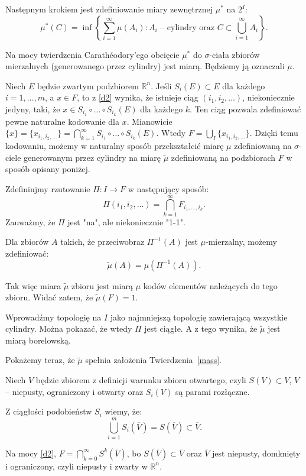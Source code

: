 \documentclass{mini}
\begin{document}
\begin{dow}
Następnym krokiem jest zdefiniowanie miary zewnętrznej $\mu^*$ na $2^I$: 
$$
\mu^*(C)=\inf \left\lbrace \sum_{i=1}^{\infty} \mu(A_i): A_i\textrm{ -- cylindry oraz } C \subset \bigcup_{i=1}^{\infty} A_i \right\rbrace.
$$

Na mocy twierdzenia Carath\'eodory'ego obcięcie $\mu^*$ do $\sigma$-ciała zbiorów mierzalnych (generowanego przez cylindry) jest miarą. Będziemy ją oznaczali $\mu$. 
 

Niech $E$ będzie zwartym podzbiorem $\mathbb{R}^n$. Jeśli $S_i(E)\subset E$ dla każdego $i=1,\ldots,m$, a $x \in F$, to z \eqref{d2} wynika, że istnieje ciąg $(i_1,i_2,\ldots)$, niekoniecznie jedyny, taki, że $x \in S_{i_1}\circ\ldots\circ S_{i_k} (E)$ dla każdego $k$. Ten ciąg pozwala zdefiniować pewne naturalne kodowanie dla $x$. Mianowicie $\lbrace x\rbrace=\lbrace x_{i_1,i_2, \ldots}\rbrace=\bigcap^{\infty}_{k=1} S_{i_1}\circ\ldots\circ S_{i_k} (E)$. Wtedy $F=\bigcup_I \lbrace x_{i_1,i_2, \ldots} \rbrace$. Dzięki temu kodowaniu, możemy w naturalny sposób przekształcić miarę $\mu$ zdefiniowaną na $\sigma$-ciele generowanym przez cylindry na miarę $ \tilde{\mu} $ zdefiniowaną na podzbiorach $F$ w sposób opisany poniżej.

Zdefiniujmy rzutowanie $\Pi: I \longrightarrow F$ w następujący sposób:
$$
\Pi(i_1,i_2,\ldots)=\bigcap^{\infty}_{k=1} F_{i_1, \ldots, i_k}.
$$
Zauważmy, że $\Pi$ jest "na", ale niekoniecznie "1-1". 

Dla zbiorów $A$ takich, że przeciwobraz $\Pi^{-1}(A)$ jest $\mu$-mierzalny, możemy zdefiniować:
$$
\tilde{\mu}(A) = \mu (\Pi^{-1}(A)). 
$$

Tak więc miara $\tilde{\mu}$ zbioru jest miarą $\mu$ kodów elementów należących do tego zbioru.
Widać zatem, że $\tilde{\mu}(F)=1$.

Wprowadźmy topologię na $I$ jako najmniejszą topologię zawierającą wszystkie cylindry. Można pokazać, że wtedy $\Pi$ jest ciągłe. A z tego wynika, że $\tilde{\mu}$ jest miarą borelowską.

Pokażemy teraz, że $\tilde{\mu}$ spełnia założenia Twierdzenia~\ref{mass}.

Niech $V$ będzie zbiorem z definicji warunku zbioru otwartego, czyli $S(V) \subset V$, $V$ -- niepusty, ograniczony i otwarty oraz $S_i(V)$ są parami rozłączne.

Z ciągłości podobieństw $S_i$ wiemy, że:
$$
\bigcup^m_{i=1} S_i\left(\overline{V}\right) = S\left(\overline{V}\right) \subset \overline{V}.
$$ 

Na mocy \eqref{d2}, $ F = \bigcap^{\infty}_{k=0} S^k(\overline{V}) $, bo $S(\overline{V})\subset \overline{V}$ oraz $\overline{V}$ jest niepusty, domknięty i ograniczony, czyli niepusty i zwarty w $\mathbb{R}^n$.


\end{dow}
\end{document}

